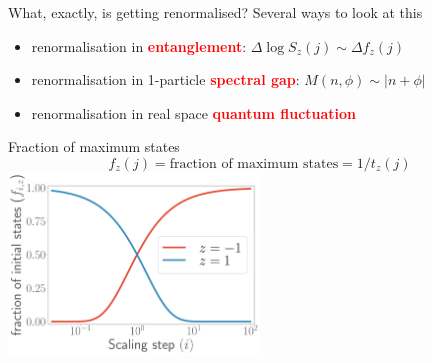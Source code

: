 \documentclass[12pt,aspectratio=169]{beamer}
\newcommand{\focus}[1]{\textcolor{red}{\bf{#1}}}
\begin{document}
\begin{frame}{What, exactly, is getting renormalised?}
	Several ways to look at this\\[10pt]
	\begin{itemize}
		\item renormalisation in \focus{entanglement}: \(\Delta \log S_z(j) \sim \Delta f_z(j) \)\\[10pt]
		\item renormalisation in 1-particle \focus{spectral gap}: \(M(n,\phi) \sim |n + \phi|\)\\[10pt]
		\item renormalisation in real space \focus{quantum fluctuation}\\[10pt]
	\end{itemize}
\end{frame}

\begin{frame}{Fraction of maximum states}
	\centering
	\[f_z(j) = \text{fraction of maximum states} = 1/t_z(j)\]
	\includegraphics[width=0.5\textwidth]{figures/fraction.pdf}
\end{frame}
\end{document}
